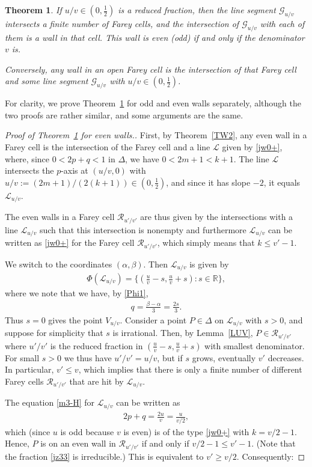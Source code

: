\documentclass[11pt,reqno,tbtags,a4paper]{amsart}
\numberwithin{equation}{section}
\renewcommand\le{\leq}
\renewcommand\ge{\geq}
\renewcommand\leq{\leqslant}
\renewcommand\geq{\geqslant}
\theoremstyle{plain}%
\newtheorem{theorem}{Theorem}[section]
\theoremstyle{definition}
\theoremstyle{remark}
\newcommand{\refT}[1]{Theorem~\ref{#1}}
\newcommand{\refL}[1]{Lemma~\ref{#1}}
\newcommand\bigset[1]{\ensuremath{\bigl\{#1\bigr\}}}
\newcommand\bbR{\mathbb R}
\newcommand\ga{\alpha}
\newcommand\gb{\beta}
\newcommand\gD{\Delta}
\newcommand\LL{{\mathcal L}}
\newcommand\LG{{\mathcal G}} %
\newcommand\cR{{\mathcal R}}
\newcommand\uv{_{u/v}}
\newcommand\uvi{_{u'/v'}}
\newcommand\0{{\boldsymbol 0}}
\newcommand\1{{\boldsymbol 1}}
\begin{document}
\begin{theorem}\label{Twalls}
  If $u/v\in(0,\frac12)$ is a reduced fraction, then
the line segment $\LG\uv$ intersects a finite number of Farey cells,
and the intersection of $\LG\uv$ with each of them is a wall in
that cell. 
This wall is even (odd) if and only if the
denominator $v$ is.

Conversely, any wall in an open Farey cell
is the intersection of that Farey cell and some line segment $\LG\uv$ 
with $u/v\in(0,\frac12)$.
\end{theorem}

For clarity, we prove \refT{Twalls} for odd and even walls separately, although 
the two proofs are rather similar, and some arguments are the same.

\begin{proof}[Proof of \refT{Twalls} for even walls.]
  First, by \refT{TW2}, any even wall in a Farey cell is
  the intersection of the Farey cell and a line $\LL$ given by \eqref{jw0+},
where,
since $0<2p+q<1$ in $\gD$, we have $0<2m+1<k+1$.
The line $\LL$ 
intersects the $p$-axis at $(u/v,0)$ with $u/v:=(2m+1)/(2(k+1))\in(0,\frac12)$,
and since it has slope $-2$, it equals $\LL\uv$.

The even walls in a Farey cell $\cR\uvi$  are thus given by the
intersections with  a line $\LL\uv$ such that this intersection is nonempty
and furthermore $\LL\uv$  can be written as \eqref{jw0+} for the Farey cell
$\cR\uvi$, which simply means that $k\le v'-1$.

We switch to the coordinates $(\ga,\gb)$. Then $\LL\uv$ is given by
\begin{align}\label{jz1}
  \Phi(\LL\uv)=\bigset{(\tfrac uv-s,\tfrac uv+s):s\in\bbR},
\end{align}
where we note that we have, by \eqref{Phi1},
\begin{align}\label{jz2}
  q=\frac{\gb-\ga}3=\frac{2s}3.
\end{align}
Thus $s=0$ gives the point $V\uv$. 
Consider a point $P\in\gD$ on $\LL\uv$ with $s>0$, and suppose for simplicity that
$s$ is irrational. 
Then, by \refL{LUV}, $P\in \cR\uvi$ where $u'/v'$ is the reduced fraction in 
$(\tfrac uv -s,\tfrac uv+s)$ with smallest denominator.
For small $s>0$ we thus have $u'/v'=u/v$, but if $s$ grows, eventually
$v'$ decreases. 
In particular, $v'\le v$, which implies that there is only a finite number
of different Farey cells $\cR\uvi$ that are hit by $\LL\uv$.

The equation \eqref{m3-H} for $\LL\uv$ can be written as 
\begin{align}\label{jz33}
2p+q=\frac{2u}v = \frac{u}{v/2},  
\end{align}
which (since $u$ is odd because $v$ is even)
is of the type \eqref{jw0+}
with $k=v/2-1$.
Hence, $P$ is on an even wall in $\cR\uvi$ if and only if 
$v/2-1\le v'-1$.
(Note that the fraction \eqref{jz33} is irreducible.)
This is equivalent to $v'\ge v/2$.
Consequently:


\end{proof}
\end{document}

